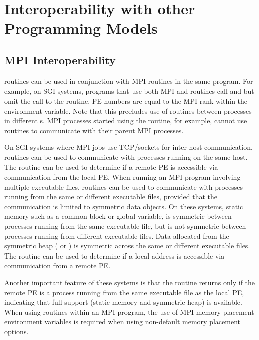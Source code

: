 \chapter{Interoperability with other Programming Models}\label{sec:mpi}

\section{\ac{MPI} Interoperability}

\begin{sloppypar} %
%
\openshmem routines can be used in conjunction with \ac{MPI} routines  in the
same program.  For example, on SGI systems, programs that use both \ac{MPI} and
\openshmem routines call  and  but omit the
call to the  routine.  \openshmem \ac{PE} numbers are equal to
the \ac{MPI} rank within the  environment variable.
Note that this precludes use of \openshmem routines between processes in
different s.  \ac{MPI} processes started using the
 routine, for example, cannot use \openshmem routines to
communicate with their parent \ac{MPI} processes.
%
\end{sloppypar}
%
On SGI systems where \ac{MPI} jobs use TCP/sockets for inter-host communication,
\openshmem routines can be used to communicate with processes running on the
same host.  The  routine can be used to determine if
a remote \ac{PE} is accessible via \openshmem communication from the local
\ac{PE}. When running an \ac{MPI} program involving multiple executable files,
\openshmem routines can be used to communicate with processes running from the
same or different executable files, provided that the communication is limited
to symmetric data objects.  On these systems, static memory such as a
\Fortran common block or \Cstd global variable, is symmetric between
processes running from the same executable file, but is not symmetric between
processes running from different executable files.  Data allocated from the
symmetric heap ( or ) is symmetric across the
same or different executable files. The routine 
can be used to determine if a local address is accessible via \openshmem
communication from a remote \ac{PE}.

Another important feature of these systems is that the
 routine returns  only if the remote
\ac{PE} is a process running from the same executable file as the local \ac{PE},
indicating that full \openshmem support (static memory and symmetric heap) is
available.  When using \openshmem routines within an \ac{MPI} program, the use
of \ac{MPI} memory placement environment variables is required when using
non-default memory placement options.

